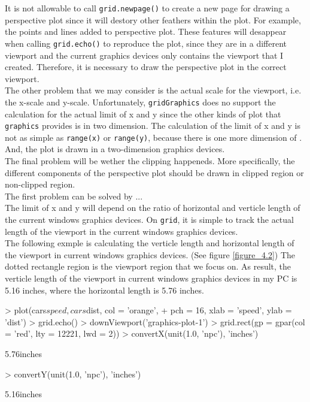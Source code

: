 \documentclass[paper=a4, fontsize=11pt]{report}
\begin{document}
It is not allowable to call \texttt{grid.newpage()} to create a new page for drawing a perspective plot since it will destory other feathers within the plot. For example, the points and lines added to perspective plot. These features will desappear when calling \texttt{grid.echo()} to reproduce the plot, since they are in a different viewport and the current graphics devices only contains the viewport that I created. Therefore, it is necessary to draw the perspective plot in the correct viewport.\\

The other problem that we may consider is the actual scale for the viewport, i.e. the x-scale and y-scale. Unfortunately, \texttt{gridGraphics} does no support the calculation for the actual limit of x and y since the other kinds of plot that \texttt{graphics} provides is in two dimension. The calculation of the limit of x and y is not as simple as \texttt{range(x)} or \texttt{range(y)}, because there is one more dimension of . And, the plot is drawn in a two-dimension graphics devices.\\

The final problem will be wether the clipping happeneds. More specifically, the different components of the perspective plot should be drawn in clipped region or non-clipped region. \\

The first problem can be solved by ...\\

The limit of x and y will depend on the ratio of horizontal and verticle length of the current windows graphics devices. On \texttt{grid}, it is simple to track the actual length of the viewport in the current windows graphics devices. \\

The following exmple is calculating the verticle length and horizontal length of the viewport in current windows graphics devices. (See figure \ref{figure_4.2}) The dotted rectangle region is the viewport region that we focus on. As result, the verticle length of the viewport in current windows graphics devices in my PC is 5.16 inches, where the horizontal length is 5.76 inches. \\


\begin{Schunk}
\begin{Sinput}
> plot(cars$speed, cars$dist, col = 'orange', 
+      pch = 16, xlab = 'speed', ylab = 'dist')
> grid.echo()
> downViewport('graphics-plot-1')
> grid.rect(gp = gpar(col = 'red', lty = 12221, lwd = 2))
> convertX(unit(1.0, 'npc'), 'inches')
\end{Sinput}
\begin{Soutput}
[1] 5.76inches
\end{Soutput}
\begin{Sinput}
> convertY(unit(1.0, 'npc'), 'inches')
\end{Sinput}
\begin{Soutput}
[1] 5.16inches
\end{Soutput}
\end{Schunk}
\end{document}
